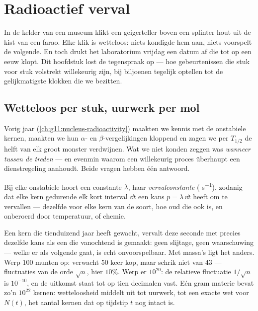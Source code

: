 \chapter{Radioactief verval}\label{ch:g12:radioactive-decay}

In de kelder van een museum klikt een geigerteller boven een splinter hout
uit de kist van een farao. Elke klik is wetteloos: niets kondigde hem aan,
niets voorspelt de volgende. En toch drukt het laboratorium vrijdag een datum
af die tot op een eeuw klopt. Dit hoofdstuk lost de tegenspraak op --- hoe
gebeurtenissen die stuk voor stuk volstrekt willekeurig zijn, bij biljoenen
tegelijk optellen tot de gelijkmatigste klokken die we bezitten.

\section{Wetteloos per stuk, uurwerk per mol}

Vorig jaar (\cref{ch:g11:nucleus-radioactivity}) maakten we kennis met de
onstabiele kernen, maakten we hun $\alpha$- en $\beta$-vergelijkingen
kloppend en zagen we per  $T_{1/2}$ de helft van elk groot
monster verdwijnen. Wat we niet konden zeggen was \emph{wanneer tussen de
treden} --- en evenmin waarom een willekeurig proces überhaupt een dienstregeling
aanhoudt. Beide vragen hebben één antwoord.

\begin{definition}[Vervalconstante]\label{def:g12:radioactive-decay:lambda}
Bij elke onstabiele  hoort een constante $\lambda$, haar
\emph{vervalconstante} ( \unit{s^{-1}}), zodanig
dat elke kern gedurende elk kort interval $\dd t$ een kans
$p = \lambda\,\dd t$ heeft om te vervallen --- dezelfde voor elke kern van de
soort, hoe oud die ook is, en onberoerd door temperatuur,  of chemie.
\end{definition}

\begin{remark}\label{rem:g12:radioactive-decay:crowds}
Een kern die tienduizend jaar heeft gewacht, vervalt deze seconde met precies
dezelfde kans als een die vanochtend is gemaakt: geen slijtage, geen
waarschuwing --- welke er als volgende gaat, is echt onvoorspelbaar. Met
massa's ligt het anders. Werp $100$ munten op: verwacht $50$ keer kop, maar
schrik niet van $43$ --- fluctuaties van de orde $\sqrt n$, hier $10\%$. Werp
er $10^{20}$: de relatieve fluctuatie $1/\sqrt n$ is $10^{-10}$, en de uitkomst
staat tot op tien decimalen vast. Eén gram materie bevat zo'n $10^{22}$
kernen: wetteloosheid middelt uit tot uurwerk, tot een exacte wet voor $N(t)$,
het aantal kernen dat op tijdstip $t$ nog intact is.
\end{remark}

